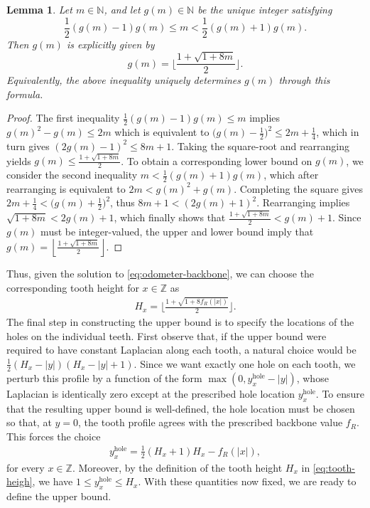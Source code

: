 \documentclass[11pt]{article}
\newtheorem{lemma}{Lemma}[section]
\newcommand{\Z}{\mathbb{Z}}
\begin{document}
\begin{lemma}\label{lem:tooth-height-expression}
Let $m\in\mathbb{N}$, and let $g(m)\in\mathbb{N}$ be the unique integer satisfying
\[
\frac{1}{2}(g(m)-1)g(m)\leq m < \frac{1}{2}(g(m)+1)g(m).
\]
Then $g(m)$ is explicitly given by
\[
g(m)=\Big\lfloor \frac{1+\sqrt{1+8m}}{2}\Big\rfloor .
\]
Equivalently, the above inequality uniquely determines $g(m)$ through this formula.
\end{lemma}
\begin{proof}
    The first inequality $\frac{1}{2}(g(m)-1)g(m)\leq m$ implies $g(m)^2-g(m)\leq 2m$ which is equivalent to $\big(g(m)-\frac{1}{2}\big)^2\leq 2m+\frac{1}{4}$, which in turn gives $(2g(m)-1)^2\leq 8m+1$. Taking the square-root and rearranging yields $g(m)\leq \frac{1+\sqrt{1+8m}}{2}$. To obtain a corresponding lower bound on $g(m)$, we consider the second inequality $m < \frac{1}{2}(g(m)+1)g(m)$, which after rearranging is equivalent to $2m<g(m)^2+g(m).$ Completing the square gives $2m+\frac{1}{4}<\big(g(m)+\frac{1}{2}\big)^2$, thus $8m+1<(2g(m)+1)^2$. Rearranging implies $\sqrt{1+8m}<2g(m)+1$, which finally shows that $ \frac{1+\sqrt{1+8m}}{2}<g(m)+1$.
    Since $g(m)$ must be integer-valued, the upper and lower bound imply that $g(m)=\left\lfloor\frac{1+\sqrt{1+8m}}{2}\right\rfloor$.
\end{proof}
Thus, given the solution to \eqref{eq:odometer-backbone}, we can choose the corresponding tooth height for $x\in\Z$ as
\begin{align}\label{eq:tooth-heigh}\tag{TH}
    H_x=\Big\lfloor \frac{1+\sqrt{1+8f_R(|x|)}}{2}\Big\rfloor.
\end{align}
The final step in constructing the upper bound is to specify the locations of the holes on the individual teeth. First observe that, if the upper bound were required to have constant Laplacian along each tooth, a natural choice would be $\frac{1}{2}(H_x-|y|)(H_x-|y|+1)$.
Since we want exactly one hole on each tooth, we perturb this profile by a function of the form
$\max(0,y_x^{\mathrm{hole}}-|y|)$, whose Laplacian is identically zero except at the prescribed hole location $y_x^{\mathrm{hole}}$.  
To ensure that the resulting upper bound is well-defined, the hole location must be chosen so that, at $y=0$, the tooth profile agrees with the prescribed backbone value $f_R$. This forces the choice
\begin{align}\label{eq:hole}\tag{Hole}
y_x^{\text{hole}}=\frac{1}{2}(H_x+1)H_x-f_R(|x|),
\end{align}
for every $x\in\mathbb{Z}$. Moreover, by the definition of the tooth height $H_x$ in \eqref{eq:tooth-heigh}, we have $1\leq y_x^{\mathrm{hole}}\leq H_x$.
With these quantities now fixed, we are ready to define the upper bound.
\end{document}
